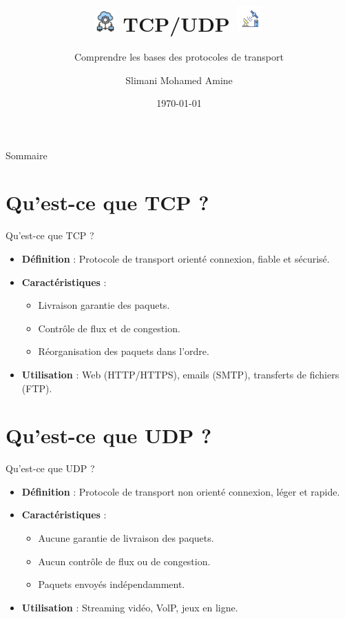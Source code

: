 \documentclass{clbeamer2024}
\title{
	\includegraphics[width=0.8cm]{logos/tcp.png} \hfill
	TCP/UDP \hfill
	\includegraphics[width=1cm]{logos/udp.png}
}
\subtitle{Comprendre les bases des protocoles de transport}
\author{Slimani Mohamed Amine}
\institute{}
\date{\today}
\begin{document}
	\setcounter{framenumber}{-1}
	\frame{\titlepage}
	
	
	
	\begin{frame}{Sommaire}
		\tableofcontents
	\end{frame}
	

\section{Qu'est-ce que TCP ?}
\begin{frame}{Qu'est-ce que TCP ?}
	\begin{itemize}
		\item \textbf{Définition} : Protocole de transport orienté connexion, fiable et sécurisé.
		\item \textbf{Caractéristiques} :
		\begin{itemize}
			\item Livraison garantie des paquets.
			\item Contrôle de flux et de congestion.
			\item Réorganisation des paquets dans l'ordre.
		\end{itemize}
		\item \textbf{Utilisation} : Web (HTTP/HTTPS), emails (SMTP), transferts de fichiers (FTP).
	\end{itemize}
\end{frame}

\section{Qu'est-ce que UDP ?}
\begin{frame}{Qu'est-ce que UDP ?}
	\begin{itemize}
		\item \textbf{Définition} : Protocole de transport non orienté connexion, léger et rapide.
		\item \textbf{Caractéristiques} :
		\begin{itemize}
			\item Aucune garantie de livraison des paquets.
			\item Aucun contrôle de flux ou de congestion.
			\item Paquets envoyés indépendamment.
		\end{itemize}
		\item \textbf{Utilisation} : Streaming vidéo, VolP, jeux en ligne.
	\end{itemize}
\end{frame}
\end{document}
